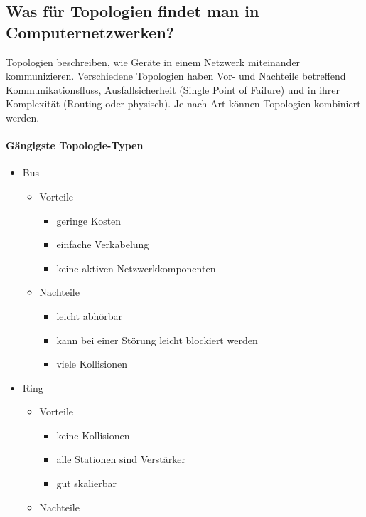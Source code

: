 \subsection*{Was für Topologien findet man in Computernetzwerken?}\label{sub:Topologies}
Topologien beschreiben, wie Geräte in einem Netzwerk miteinander kommunizieren. Verschiedene Topologien haben Vor- und Nachteile betreffend Kommunikationsfluss, Ausfallsicherheit (Single Point of Failure) und in ihrer Komplexität (Routing oder physisch). Je nach Art können Topologien kombiniert werden.

\paragraph*{Gängigste Topologie-Typen}
\begin{itemize}
    \item Bus
    \begin{itemize}
        \item Vorteile
        \begin{itemize}
            \item geringe Kosten
            \item einfache Verkabelung
            \item keine aktiven Netzwerkkomponenten
        \end{itemize}
        \item Nachteile
        \begin{itemize}
            \item leicht abhörbar
            \item kann bei einer Störung leicht blockiert werden
            \item viele Kollisionen
        \end{itemize}
    \end{itemize}
    \item Ring
    \begin{itemize}
        \item Vorteile
        \begin{itemize}
            \item keine Kollisionen
            \item alle Stationen sind Verstärker
            \item gut skalierbar
        \end{itemize}
        \item Nachteile
        \begin{itemize}

\end{itemize}
\end{itemize}
\end{itemize}

